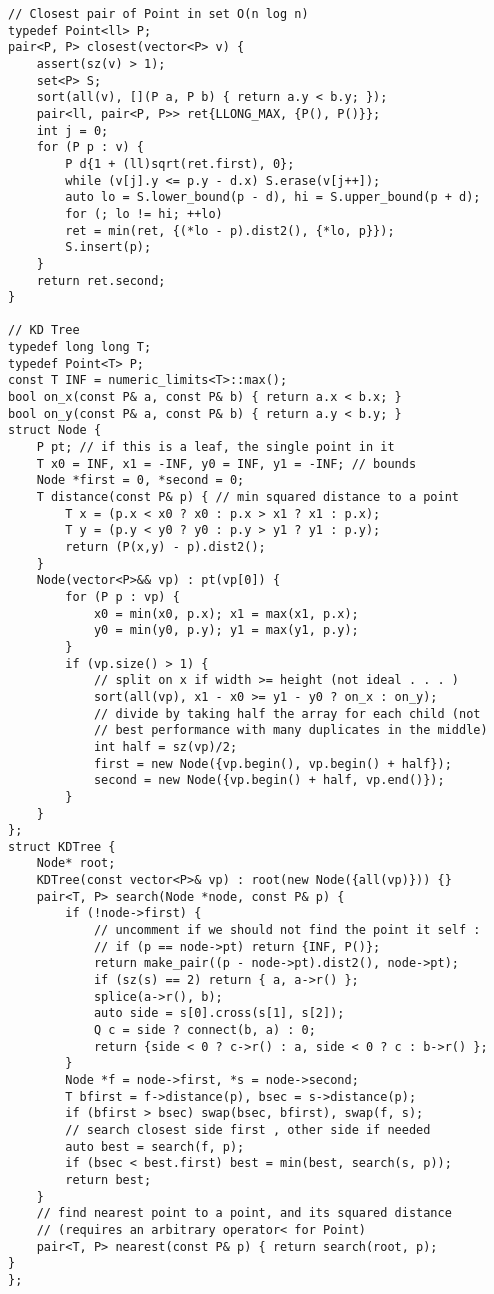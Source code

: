 \documentclass[a4paper,9pt]{article}
\begin{document}
\begin{lstlisting}
// Closest pair of Point in set O(n log n)
typedef Point<ll> P;
pair<P, P> closest(vector<P> v) {
	assert(sz(v) > 1);
	set<P> S;
	sort(all(v), [](P a, P b) { return a.y < b.y; });
	pair<ll, pair<P, P>> ret{LLONG_MAX, {P(), P()}};
	int j = 0;
	for (P p : v) {
		P d{1 + (ll)sqrt(ret.first), 0};
		while (v[j].y <= p.y - d.x) S.erase(v[j++]);
		auto lo = S.lower_bound(p - d), hi = S.upper_bound(p + d);
		for (; lo != hi; ++lo)
		ret = min(ret, {(*lo - p).dist2(), {*lo, p}});
		S.insert(p);
	}
	return ret.second;
}

// KD Tree
typedef long long T;
typedef Point<T> P;
const T INF = numeric_limits<T>::max();
bool on_x(const P& a, const P& b) { return a.x < b.x; }
bool on_y(const P& a, const P& b) { return a.y < b.y; }
struct Node {
	P pt; // if this is a leaf, the single point in it
	T x0 = INF, x1 = -INF, y0 = INF, y1 = -INF; // bounds
	Node *first = 0, *second = 0;
	T distance(const P& p) { // min squared distance to a point
		T x = (p.x < x0 ? x0 : p.x > x1 ? x1 : p.x);
		T y = (p.y < y0 ? y0 : p.y > y1 ? y1 : p.y);
		return (P(x,y) - p).dist2();
	}
	Node(vector<P>&& vp) : pt(vp[0]) {
		for (P p : vp) {
			x0 = min(x0, p.x); x1 = max(x1, p.x);
			y0 = min(y0, p.y); y1 = max(y1, p.y);
		}
		if (vp.size() > 1) {
			// split on x if width >= height (not ideal . . . )
			sort(all(vp), x1 - x0 >= y1 - y0 ? on_x : on_y);
			// divide by taking half the array for each child (not
			// best performance with many duplicates in the middle)
			int half = sz(vp)/2;
			first = new Node({vp.begin(), vp.begin() + half});
			second = new Node({vp.begin() + half, vp.end()});
		}
	}
};
struct KDTree {
	Node* root;
	KDTree(const vector<P>& vp) : root(new Node({all(vp)})) {}
	pair<T, P> search(Node *node, const P& p) {
		if (!node->first) {
			// uncomment if we should not find the point it self :
			// if (p == node->pt) return {INF, P()};
			return make_pair((p - node->pt).dist2(), node->pt);
			if (sz(s) == 2) return { a, a->r() };
			splice(a->r(), b);
			auto side = s[0].cross(s[1], s[2]);
			Q c = side ? connect(b, a) : 0;
			return {side < 0 ? c->r() : a, side < 0 ? c : b->r() };
		}
		Node *f = node->first, *s = node->second;
		T bfirst = f->distance(p), bsec = s->distance(p);
		if (bfirst > bsec) swap(bsec, bfirst), swap(f, s);
		// search closest side first , other side if needed
		auto best = search(f, p);
		if (bsec < best.first) best = min(best, search(s, p));
		return best;
	}
	// find nearest point to a point, and its squared distance
	// (requires an arbitrary operator< for Point)
	pair<T, P> nearest(const P& p) { return search(root, p);
}
};


\end{lstlisting}
\end{document}
